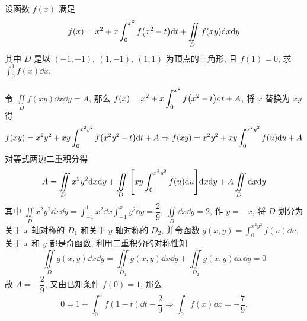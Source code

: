 \begin{example}
    设函数 $f(x)$ 满足
    $$f(x)=x^2+x\int_{0}^{x^2}f\qty(x^2-t)\dd t+\iint\limits_Df(xy)\dd x\dd y$$
    其中 $D$ 是以 $(-1,-1),~(1,-1),~(1,1)$ 为顶点的三角形, 且 $f(1)=0$, 求 $\displaystyle\int_{0}^{1}f(x)\dd x.$
\end{example}
\begin{solution}
    令 $\displaystyle\iint\limits_D f(xy)\dd x\dd y=A$, 那么 $\displaystyle f(x)=x^2+x\int_{0}^{x^2}f\qty(x^2-t)\dd t+A$,
    将 $x$ 替换为 $xy$ 得 $$f(xy)=x^2y^2+xy\int_{0}^{x^2y^2}f\qty(x^2y^2-t)\dd t+A\Rightarrow f(xy)=x^2y^2+xy\int_{0}^{x^2y^2}f(u)\dd u+A$$
    对等式两边二重积分得 $$A=\iint\limits_D x^2y^2\dd x\dd y+\iint\limits_D\qty[xy\int_{0}^{x^2y^2}f(u)\dd u]\dd x\dd y+A\iint\limits_D \dd x\dd y$$
    其中 $\displaystyle\iint\limits_D x^2y^2\dd x\dd y=\int_{-1}^{1}x^2\dd x\int_{-1}^{x}y^2\dd y=\dfrac{2}{9},~\iint\limits_D \dd x\dd y=2$,
    作 $y=-x$, 将 $D$ 划分为关于 $x$ 轴对称的 $D_1$ 和关于 $y$ 轴对称的 $D_2$, 并令函数 $\displaystyle g(x,y)=\int_{0}^{x^2y^2}f(u)\dd u$, 关于 $x$ 和 $y$ 都是奇函数, 利用二重积分的对称性知
    $$\iint\limits_D g(x,y)\dd x\dd y=\iint\limits_{D_1}g(x,y)\dd x\dd y+\iint\limits_{D_2}g(x,y)\dd x\dd y=0$$
    故 $A=-\dfrac{2}{9}$, 又由已知条件 $f(0)=1$, 那么
    $$0=1+\int_{0}^{1}f(1-t)\dd t-\dfrac{2}{9}\Rightarrow\int_{0}^{1}f(x)\dd x=-\dfrac{7}{9}.$$
\end{solution}

